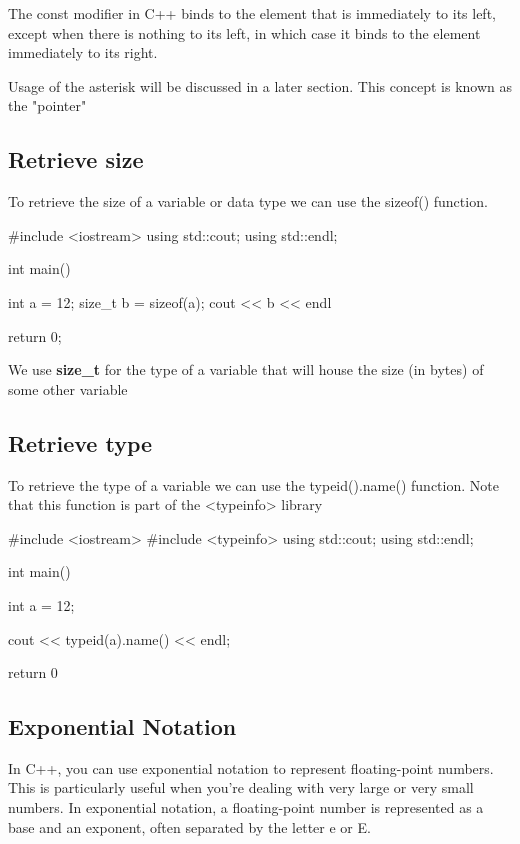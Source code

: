 \documentclass{report}
\begin{document}
    \bigbreak \noindent 
    The const modifier in C++ binds to the element that is immediately to its left, except when there is nothing to its left, in which case it binds to the element immediately to its right.
    \bigbreak \noindent 
    \begin{notebox}
			Usage of the asterisk will be discussed in a later section. This concept is known as the "pointer"
		\end{notebox}


    \pagebreak
    \subsection{Retrieve size}
    \bigbreak \noindent 
    To retrieve the size of a variable or data type we can use the sizeof() function.
    \bigbreak \noindent 
    
    \begin{cppcode}
#include <iostream>
using std::cout;
using std::endl;

int main() {
    int a = 12;
    size_t b = sizeof(a);
    cout << b << endl

    return 0;
}
    \end{cppcode}
    
    \bigbreak \noindent 
    \begin{notebox}
        We use \textbf{size\_t} for the type of a variable that will house the size (in bytes) of some other variable
    \end{notebox}

    \bigbreak \noindent \bigbreak \noindent 
    \subsection{Retrieve type}
    \bigbreak \noindent 
    To retrieve the type of a variable we can use the typeid().name() function. Note that this function is part of the <typeinfo> library
    \bigbreak \noindent 
    
    \begin{cppcode}
#include <iostream>
#include <typeinfo>
using std::cout;
using std::endl;

int main(){

    int a = 12;

    cout << typeid(a).name() << endl;

    return 0
}
    \end{cppcode}
    
    \pagebreak
    \subsection{Exponential Notation}
    \bigbreak \noindent 
    In C++, you can use exponential notation to represent floating-point numbers. This is particularly useful when you're dealing with very large or very small numbers. In exponential notation, a floating-point number is represented as a base and an exponent, often separated by the letter e or E.
    \bigbreak \noindent 
    
\end{document}
